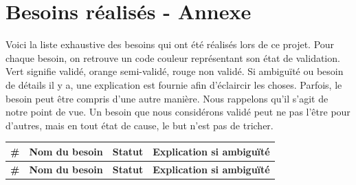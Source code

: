 \documentclass{article}
\begin{document}
\section{Besoins réalisés - Annexe}
\label{Spec}

Voici la liste exhaustive des besoins qui ont été réalisés lors de ce projet. Pour chaque besoin, on retrouve un code couleur représentant
son état de validation. Vert signifie validé, orange semi-validé, rouge non validé. Si ambiguïté ou besoin de détails il y a, une explication
est fournie afin d'éclaircir les choses. Parfois, le besoin peut être compris d'une autre manière. Nous rappelons qu'il s'agit de notre point de vue.
Un besoin que nous considérons validé peut ne pas l'être pour d'autres, mais en tout état de cause, le but n'est pas de tricher.

\begin{longtable}{|c|p{5cm}|c|p{5cm}|}
    \hline
    \textbf{\#} & \textbf{Nom du besoin} & \textbf{Statut} & \textbf{Explication si ambiguïté} \\
    \hline
    \endfirsthead

    \hline
    \textbf{\#} & \textbf{Nom du besoin} & \textbf{Statut} & \textbf{Explication si ambiguïté} \\
    \hline
    \endhead


\end{longtable}
\end{document}
